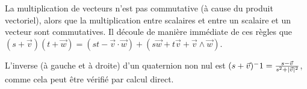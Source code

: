 La multiplication de vecteurs n'est pas commutative (à cause du produit vectoriel), alors que la 
multiplication entre scalaires et entre un scalaire et un vecteur sont commutatives. Il découle de
 manière immédiate de ces règles que $(s + \vec{v})(t + \vec{w}) = (st - \vec{v}\cdot\vec{w}) + 
 (s\vec{w}+t\vec{v}+\vec{v}\wedge\vec{w})$.

L'inverse (à gauche et à droite) d'un quaternion non nul est $(s + \vec{v})^-1 = 
\frac{s - \vec{v}}{s^2 + \lvert\vec{v}\rvert^2}$, comme cela peut être vérifié par calcul direct.